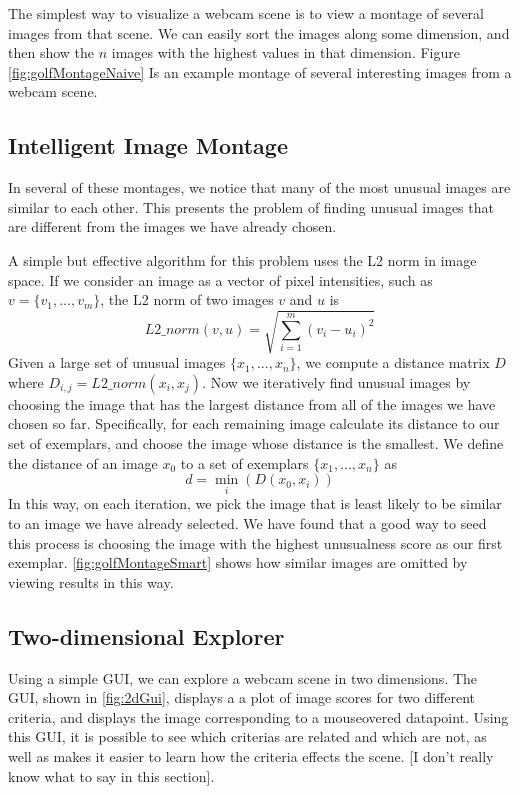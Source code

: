 The simplest way to visualize a webcam scene is to view a montage of several images from that scene.  We can easily sort the images along some dimension, and then show the $n$ images with the highest values in that dimension.  Figure \ref{fig:golfMontageNaive} Is an example montage of several interesting images from a webcam scene.

\subsection{Intelligent Image Montage}

In several of these montages, we notice that many of the most unusual images are similar to each other.  This presents the problem of finding unusual images that are different from the images we have already chosen.

A simple but effective algorithm for this problem uses the L2 norm in image space.  If we consider an image as a vector of pixel intensities, such as $v = \{v_1, ..., v_m\}$, the L2 norm of two images $v$ and $u$ is $$L2\_norm(v,u) = \sqrt{\sum_{i=1}^m{(v_i-u_i)^2}}$$  Given a large set of unusual images $\{x_1, ..., x_n\}$, we compute a distance matrix $D$ where $D_{i,j} = L2\_norm(x_i, x_j).$  Now we iteratively find unusual images by choosing the image that has the largest distance from all of the images we have chosen so far.  Specifically, for each remaining image calculate its distance to our set of exemplars, and choose the image whose distance is the smallest.  We define the distance of an image $x_0$ to a set of exemplars $\{x_1, ..., x_n\}$ as $$d = \min_i(D(x_0, x_i))$$In this way, on each iteration, we pick the image that is least likely to be similar to an image we have already selected.  We have found that a good way to seed this process is choosing the image with the highest unusualness score as our first exemplar.  \ref{fig:golfMontageSmart} shows how similar images are omitted by viewing results in this way.

\subsection{Two-dimensional Explorer}


Using a simple GUI, we can explore a webcam scene in two dimensions.  The GUI, shown in \ref{fig:2dGui}, displays a a plot of image scores for two different criteria, and displays the image corresponding to a mouseovered datapoint.  Using this GUI, it is possible to see which criterias are related and which are not, as well as makes it easier to learn how the criteria effects the scene. [I don't really know what to say in this section].

